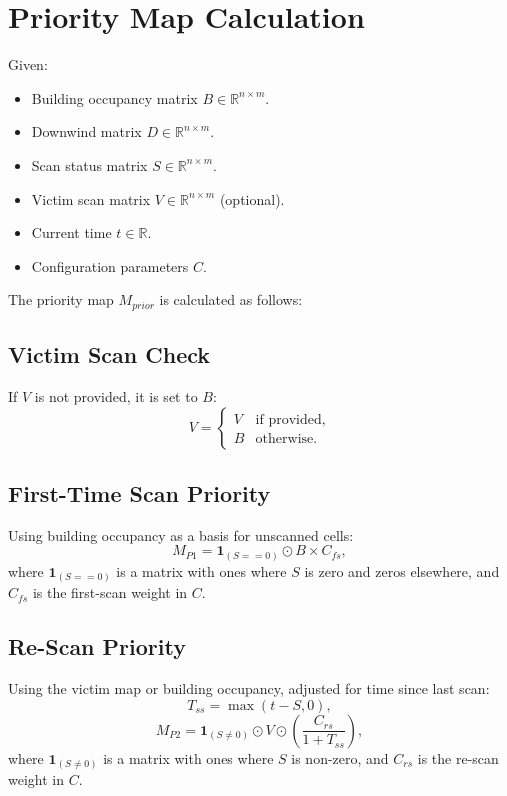\documentclass{article}
\begin{document}

\section*{Priority Map Calculation}

Given:
\begin{itemize}
    \item Building occupancy matrix $B \in \mathbb{R}^{n \times m}$.
    \item Downwind matrix $D \in \mathbb{R}^{n \times m}$.
    \item Scan status matrix $S \in \mathbb{R}^{n \times m}$.
    \item Victim scan matrix $V \in \mathbb{R}^{n \times m}$ (optional).
    \item Current time $t \in \mathbb{R}$.
    \item Configuration parameters $C$.
\end{itemize}

The priority map $M_{prior}$ is calculated as follows:

\subsection*{Victim Scan Check}
If $V$ is not provided, it is set to $B$:
\[ V = \begin{cases} 
V & \text{if provided}, \\
B & \text{otherwise}.
\end{cases} \]

\subsection*{First-Time Scan Priority}
Using building occupancy as a basis for unscanned cells:
\[ M_{P1} = \mathbf{1}_{(S == 0)} \odot B \times C_{fs}, \]
where $\mathbf{1}_{(S == 0)}$ is a matrix with ones where $S$ is zero and zeros elsewhere, and $C_{fs}$ is the first-scan weight in $C$.

\subsection*{Re-Scan Priority}
Using the victim map or building occupancy, adjusted for time since last scan:
\[ T_{ss} = \max(t - S, 0), \]
\[ M_{P2} = \mathbf{1}_{(S \neq 0)} \odot V \odot \left( \frac{C_{rs}}{1 + T_{ss}} \right), \]
where $\mathbf{1}_{(S \neq 0)}$ is a matrix with ones where $S$ is non-zero, and $C_{rs}$ is the re-scan weight in $C$.
\end{document}
